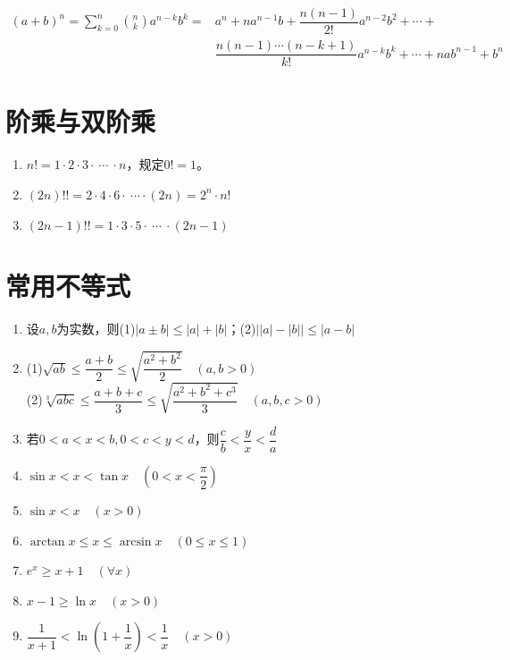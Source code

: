 \begin{equation}
    \begin{aligned}
        (a+b)^n=\sum_{k=0}^n\binom{n}{k}a^{n-k}b^k=
        &a^n+na^{n-1}b+\dfrac{n(n-1)}{2!}a^{n-2}b^2+\cdots+ \\
        &\dfrac{n(n-1)\cdots(n-k+1)}{k!}a^{n-k}b^k+\cdots+nab^{n-1}+b^n        
    \end{aligned}\nonumber
\end{equation}

\section{阶乘与双阶乘}
\begin{enumerate}
    \item $n!=1\cdot2\cdot3\cdot \ \cdots \ \cdot n$，规定$0!=1$。
    \item $(2n)!!=2\cdot4\cdot6\cdot \ \cdots \cdot (2n)=2^n\cdot n!$
    \item $(2n-1)!!=1\cdot3\cdot5\cdot \ \cdots \ \cdot (2n-1)$
\end{enumerate}

\section{常用不等式}
\begin{enumerate}
    \item 设$a,b$为实数，则(1)$\left|a\pm b\right|\leq\left|a\right|+\left|b\right|$；(2)$\left|\left|a\right|-\left|b\right|\right|\leq\left|a-b\right|$
    
    \item (1)$\sqrt{ab}\leq\dfrac{a+b}{2}\leq\sqrt{\dfrac{a^2+b^2}{2}} \quad (a,b>0)$ \\
    (2)$\sqrt[3]{abc}\leq\dfrac{a+b+c}{3}\leq\sqrt{\dfrac{a^2+b^2+c^3}{3}} \quad (a,b,c>0)$

    \item 若$0<a<x<b,0<c<y<d$，则$\dfrac{c}{b}<\dfrac{y}{x}<\dfrac{d}{a}$

    \item $\sin x<x< \tan x \quad \left( 0<x<\dfrac{\pi}{2} \right)$

    \item $\sin x<x \quad (x>0)$

    \item $\arctan x\leq x\leq \arcsin x \quad (0\leq x\leq 1)$

    \item $e^x\geq x+1 \quad (\forall x)$

    \item $x-1\geq\ln x \quad (x>0)$

    \item $\dfrac{1}{x+1}<\ln(1+\dfrac{1}{x})<\dfrac{1}{x} \quad (x>0)$
\end{enumerate}

